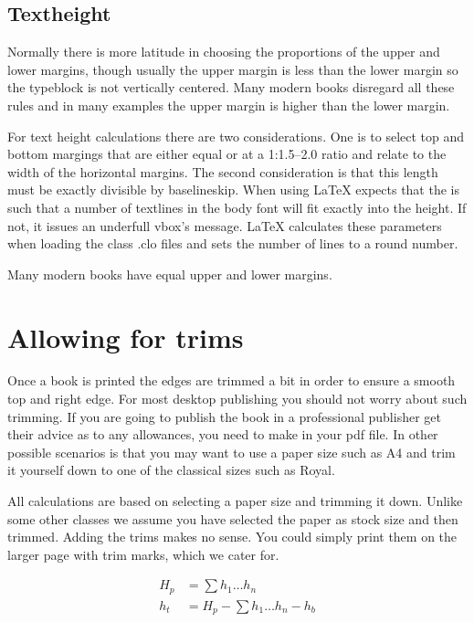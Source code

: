 \subsection{Textheight}
Normally there is more latitude in choosing the 
proportions 
of the upper and lower margins, though usually the upper 
margin is less than the lower margin
so the typeblock is not vertically centered. Many modern books disregard all these rules and in many examples the upper margin is higher than the lower margin.

For text height calculations there are two considerations. One is to select top and bottom margings that are either equal or at a 1:1.5--2.0 ratio and relate to the width of the horizontal margins. The second consideration is that this length must be exactly divisible by baselineskip. When using  LaTeX expects that the  is such that a number of textlines in the body font will fit exactly into the height. If not, it issues an underfull vbox's message. LaTeX calculates these parameters when loading the class .clo files and sets the number of lines to a round number.

Many modern books have equal upper and lower margins.
\bigskip

\section{Allowing for trims}

Once a book is printed the edges are trimmed a bit in order to ensure a smooth top and right edge. For most desktop publishing you should not worry about such trimming. If you are going to publish the book in a professional publisher get their advice as to any allowances, you need to make in your pdf file. In other possible scenarios is that you may want to use a paper size such as A4 and trim it yourself down to one of the classical sizes such as Royal. 

All calculations are based on selecting a paper size and trimming it down. Unlike some other classes we assume you have selected the paper as stock size and then trimmed. Adding the trims makes no sense. You could simply print them on the larger page with trim marks, which we cater for.

  \begin{align}
   H_p    & = \sum h_1\ldots h_n\\
      h_t  &= H_p -   \sum h_1\ldots h_n - h_b
  \end{align}

